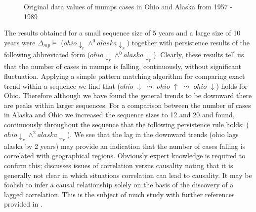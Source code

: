 \begin{figure}
\centerline{}
\caption{\label{graph:mumps_ohio_1}{Original data values of mumps
cases in Ohio and Alaska from 1957 - 1989}}
\end{figure}

The results obtained for a small sequence size of 5 years and a large
size of 10 years were $\Delta_{mp} \models$  ($ohio\downarrow_r \wedge^0 alaska\downarrow_r$)
together with persistence results of the following abbreviated form
 ($ohio\downarrow_r \wedge^0
alaska\downarrow_r$). Clearly, these results tell us 
that the number of cases in mumps is falling, continuously, without
significant fluctuation.  
Applying a simple pattern matching algorithm for comparing exact
trend within a sequence we find that 
($ohio$ $\downarrow$ $\leadsto$ $ohio$ $\uparrow$ $\leadsto$ $ohio$ $\downarrow$) holds for Ohio. Therefore
although we have found the general trends to be downward there are
peaks within larger sequences.
For a comparison between the
number of cases in Alaska and Ohio we increased the sequence sizes to
12 and 20 and found, continuously throughout the sequence that the
following persistence rule holds: 
($ohio\downarrow_r \wedge^2 alaska\downarrow_r$). We see that the lag in
the downward trends (ohio lags alaska by 2 years) may provide an
indication that the number of 
cases falling is correlated with geographical regions. Obviously
expert knowledge is required to confirm this; \cite{fay98b} discusses
issues of correlation versus causality noting that it is generally not
clear in which situations correlation can lead to causality. It may be
foolish to infer a causal relationship solely on the basis of the
discovery of a lagged correlation. This is the subject of much study
with further references provided in \cite{gmp97}.

